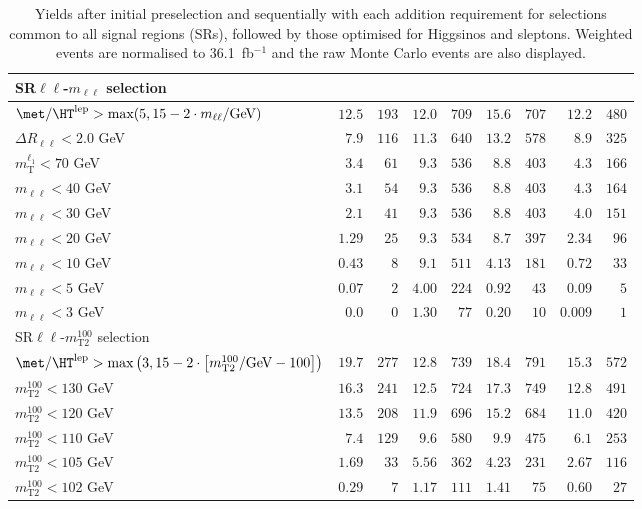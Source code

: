 \begin{table}
\begin{center}
\begin{tabular*}{\textwidth}{@{\extracolsep{\fill}}lrrrrrrrr}
\midrule
SR$\ell\ell$-$m_{\ell\ell}$ selection &  &  &  & \\ 
\midrule
$\met / \HT^\text{lep} > \text{max}(5, 15-2\cdot m_{\ell\ell}/\text{GeV})$ & $12.5$ & $193$    & $12.0$ & $709$    & $15.6$ & $707$    & $12.2$ & $480$   \\ 
    $\Delta R_{\ell\ell} < 2.0$ GeV & $7.9$ & $116$    & $11.3$ & $640$    & $13.2$ & $578$    & $8.9$ & $325$   \\ 
    $m_\text{T}^{\ell_1} < 70$ GeV & $3.4$ & $61$    & $9.3$ & $536$    & $8.8$ & $403$    & $4.3$ & $166$   \\ 
    $m_{\ell\ell} < 40$ GeV & $3.1$ & $54$    & $9.3$ & $536$    & $8.8$ & $403$    & $4.3$ & $164$   \\ 
    $m_{\ell\ell} < 30$ GeV & $2.1$ & $41$    & $9.3$ & $536$    & $8.8$ & $403$    & $4.0$ & $151$   \\ 
    $m_{\ell\ell} < 20$ GeV & $1.29$ & $25$    & $9.3$ & $534$    & $8.7$ & $397$    & $2.34$ & $96$   \\ 
    $m_{\ell\ell} < 10$ GeV & $0.43$ & $8$    & $9.1$ & $511$    & $4.13$ & $181$    & $0.72$ & $33$   \\ 
    $m_{\ell\ell} < 5$ GeV & $0.07$ & $2$    & $4.00$ & $224$    & $0.92$ & $43$    & $0.09$ & $5$   \\ 
    $m_{\ell\ell} < 3$ GeV & $0.0$ & $0$    & $1.30$ & $77$    & $0.20$ & $10$    & $0.009$ & $1$   \\ 
    \midrule
SR$\ell\ell$-$m_\text{T2}^{100}$ selection &  &  &  & \\ 
\midrule
$\met / \HT^\text{lep} > \text{max}\left(3, 15-2\cdot \left[m_\text{T2}^{100}/\text{GeV} - 100\right]\right)$ & $19.7$ & $277$    & $12.8$ & $739$    & $18.4$ & $791$    & $15.3$ & $572$   \\ 
    $m_\text{T2}^{100} < 130$ GeV & $16.3$ & $241$    & $12.5$ & $724$    & $17.3$ & $749$    & $12.8$ & $491$   \\ 
    $m_\text{T2}^{100} < 120$ GeV & $13.5$ & $208$    & $11.9$ & $696$    & $15.2$ & $684$    & $11.0$ & $420$   \\ 
    $m_\text{T2}^{100} < 110$ GeV & $7.4$ & $129$    & $9.6$ & $580$    & $9.9$ & $475$    & $6.1$ & $253$   \\ 
    $m_\text{T2}^{100} < 105$ GeV & $1.69$ & $33$    & $5.56$ & $362$    & $4.23$ & $231$    & $2.67$ & $116$   \\ 
    $m_\text{T2}^{100} < 102$ GeV & $0.29$ & $7$    & $1.17$ & $111$    & $1.41$ & $75$    & $0.60$ & $27$   \\ 
    
  \bottomrule
  \end{tabular*}
\end{center}
\caption{ Yields after initial preselection and sequentially with each addition requirement 
for selections common to all signal regions (SRs), 
followed by those optimised for Higgsinos and sleptons. 
Weighted events are normalised to 36.1~fb$^{-1}$ and the raw Monte Carlo events are also displayed.
}
\label{tab:cutflow_Higgsino}
\end{table} 
  